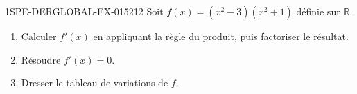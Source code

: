 \begin{exercice}{1SPE-DERGLOBAL-EX-015}{2}{12}
Soit $f(x) = (x^2-3)(x^2+1)$ définie sur $\mathbb{R}$.
\begin{enumerate}
  \item Calculer $f'(x)$ en appliquant la règle du produit, puis factoriser le résultat.
  \item Résoudre $f'(x) = 0$.
  \item Dresser le tableau de variations de $f$.
\end{enumerate}
\end{exercice}
